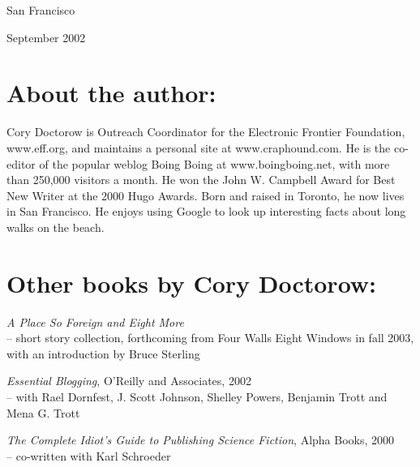 San Francisco

September 2002

\section{About the author:}

Cory Doctorow is Outreach Coordinator for the Electronic Frontier
Foundation, www.eff.org, and maintains a personal site at
www.craphound.com. He is the co-editor of the popular weblog Boing
Boing at www.boingboing.net, with more than 250,000 visitors a
month. He won the John W. Campbell Award for Best New Writer at the
2000 Hugo Awards. Born and raised in Toronto, he now lives in San
Francisco. He enjoys using Google to look up interesting facts
about long walks on the beach.

\section{Other books by Cory Doctorow:}

\emph{A Place So Foreign and Eight More}\\– short story collection,
forthcoming from Four Walls Eight Windows in fall 2003, with an
introduction by Bruce Sterling

\emph{Essential Blogging}, O'Reilly and Associates, 2002\\– with
Rael Dornfest, J. Scott Johnson, Shelley Powers, Benjamin Trott and
Mena G. Trott

\emph{The Complete Idiot's Guide to Publishing Science Fiction},
Alpha Books, 2000\\– co-written with Karl Schroeder

\\\\
